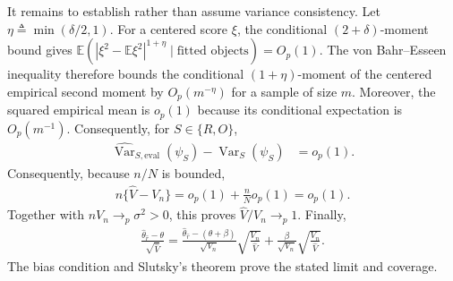 It remains to establish rather than assume variance consistency. Let
$\eta\triangleq\min(\delta/2,1)$. For a centered score $\xi$, the conditional
$(2+\delta)$-moment bound gives
$\mathbb E(|\xi^2-\mathbb E\xi^2|^{1+\eta}\mid\text{fitted objects})=O_p(1)$.
The von Bahr--Esseen inequality therefore bounds the conditional
$(1+\eta)$-moment of the centered empirical second moment by
$O_p(m^{-\eta})$ for a sample of size $m$. Moreover, the squared empirical
mean is $o_p(1)$ because its conditional expectation is $O_p(m^{-1})$.
Consequently, for $S\in\{R,O\}$,
\begin{align*}
\widehat{\operatorname{Var}}_{S,\mathrm{eval}}(\psi_S)
-\operatorname{Var}_S(\psi_S)
&=o_p(1).
\end{align*}
Consequently, because $n/N$ is bounded,
\begin{align*}
n\{\widehat V-V_n\}=o_p(1)+\frac nN o_p(1)=o_p(1).
\end{align*}
Together with $nV_n\to_p\sigma^2>0$, this proves
$\widehat V/V_n\to_p1$. Finally,
\begin{align*}
\frac{\widehat\theta_{\widehat r}-\theta}{\sqrt{\widehat V}}=\frac{\widehat\theta_{\widehat r}-(\theta+\beta)}{\sqrt{V_n}}\sqrt{\frac{V_n}{\widehat V}}+\frac{\beta}{\sqrt{V_n}}\sqrt{\frac{V_n}{\widehat V}}.
\end{align*}
The bias condition and Slutsky's theorem prove the stated limit and coverage.


